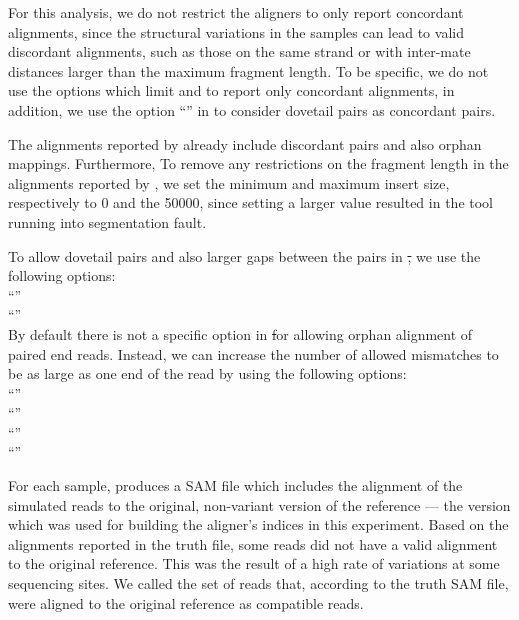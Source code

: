 For this analysis, we do not restrict the aligners to only report concordant alignments, since the structural variations in the samples can lead to valid discordant alignments, such as those on
the same strand or with inter-mate distances larger than the maximum fragment length. To be specific, we do not use the options which limit \bt and \puffaligner to report only concordant alignments, in addition, we use the option ``'' in \bt to consider dovetail pairs as concordant pairs. 

The alignments reported by \debga already include discordant pairs and also orphan mappings. Furthermore, To remove any restrictions on the fragment length in the alignments reported by \debga, we set the minimum and maximum insert size, respectively to 0 and the 50000, since setting a larger value resulted in the tool running into segmentation fault. 

To allow dovetail pairs and also larger gaps between the pairs in \st, we use the following options:\\
``''\\
``''\\
By default there is not a specific option in \st for allowing orphan alignment of paired end reads. Instead, we can increase the number of allowed mismatches to be as large as one end of the read by using the following options:\\
``''\\
``''\\
``''\\
``''

For each sample, \mason produces a SAM file which includes the alignment of the simulated reads to the original, non-variant version of the reference --- the version which was used for building the aligner’s indices in this experiment. Based on the alignments reported in the truth file, some reads did not have a valid alignment to the original reference. This was the result of a high rate of variations at some sequencing sites. We called the set of reads that, according to the truth SAM file, were aligned to the original reference as compatible reads.

